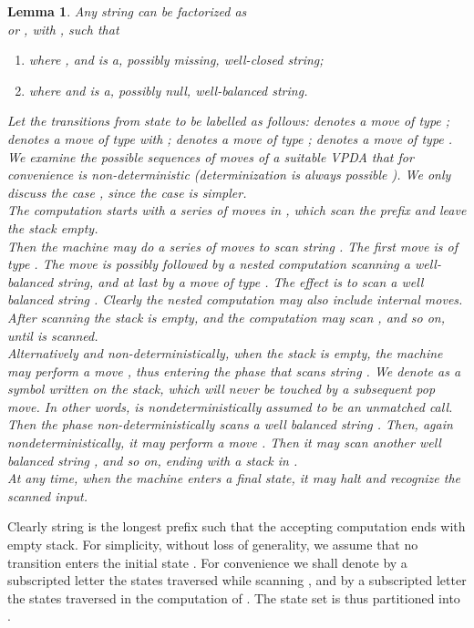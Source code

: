 \documentclass[3p,11pt]{elsarticle}
\newtheorem{lemma}[theorem]{Lemma}
\newenvironment{proof}[1][Proof]{\begin{trivlist}
\item[\hskip \labelsep {\bfseries #1}]}{\end{trivlist}}
\begin{document}
\begin{lemma}\label{LemmaStruttVPL}
 Any
string  can be factorized as\\
   or ,   with , such that
\begin{enumerate}
\item  where , and  is a, possibly missing, well-closed string;
    \item
    
 where  and  is a, possibly null, well-balanced string.
\end{enumerate}
\begin{proof}
 Let the transitions from state  to   be labelled as follows:  denotes a move of type ;
   denotes a move of type  with ;
   denotes a move of type ;
   denotes  a move of type .
 \\
  We examine the possible sequences of moves of a suitable VPDA  that for convenience is non-deterministic (determinization is always possible \cite{AluMad04}).
  We only discuss the case , since the case  is simpler.
\\
The computation starts with a series of moves in , which scan the prefix 
 and leave the stack empty.
\\ Then the machine may do a series of moves to scan string .
    The first move is of type . The move is
 possibly followed  by a nested computation scanning a well-balanced string, and at last by a move of type . The effect is  to scan a well balanced string . Clearly the nested computation may also include internal moves.
\\ After scanning  the stack is empty, and the
 computation may scan  , and so on, until  is scanned.
\\ Alternatively and non-deterministically, when the stack is empty, the machine may perform a move
    ,  thus  entering the phase that scans string . We denote as  a symbol written on the stack, which will never be touched by a subsequent pop move. In other words,  is nondeterministically assumed to be an unmatched call.
\\ Then the  phase non-deterministically scans a well balanced string . Then, again nondeterministically, it may
perform a move . Then it may scan another well balanced string , and so on, ending with a stack in .
\\
  At any time, when the machine enters a final state, it may halt and recognize the scanned input.
\end{proof}
\end{lemma}
Clearly  string  is the longest prefix such that the accepting computation ends with empty stack. For simplicity, without loss of generality, we assume that no transition enters the initial state . For convenience we shall denote by a subscripted letter  the states traversed while scanning , and by a subscripted letter  the states traversed in the computation of . The state set is thus partitioned into .
\end{document}
